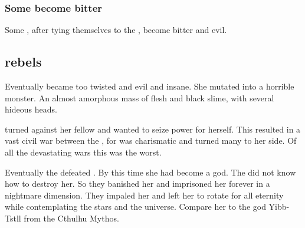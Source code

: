 \subsubsection{Some \Draecchonosh{} become bitter}
Some \draecchonosh, after tying themselves to the \xss, become bitter and evil. 










\subsection[Tyrasshana rebels]{\Tiamat rebels}
Eventually \Tiamat became too twisted and evil and insane.
She mutated into a horrible monster. 
An almost amorphous mass of flesh and black slime, with several hideous heads. 

\Tiamat turned against her fellow \dragons and wanted to seize power for herself.
This resulted in a vast civil war between the \dragons, for \Tiamat was charismatic and turned many \dragons to her side.
Of all the devastating \dragon wars this was the worst. 

Eventually the \dragons defeated \Tiamat.
By this time she had become a god.
The \dragons did not know how to destroy her. 
So they banished her and imprisoned her forever in a nightmare dimension.
They impaled her and left her to rotate for all eternity while contemplating the stars and the universe.
Compare her to the god Yibb-Tstll from the Cthulhu Mythos. 

